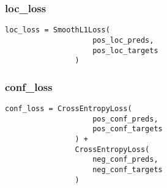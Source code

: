 \subsubsection{loc\_loss}
\begin{lstlisting}[caption={location损失}]
	loc_loss = SmoothL1Loss(
					pos_loc_preds, 
					pos_loc_targets
				)
\end{lstlisting}
\subsubsection{conf\_loss}
\begin{lstlisting}[caption={confidence损失}]
	conf_loss = CrossEntropyLoss(
					pos_conf_preds,
					pos_conf_targets
				) + 
				CrossEntropyLoss(
					neg_conf_preds,
					neg_conf_targets
				)
\end{lstlisting}